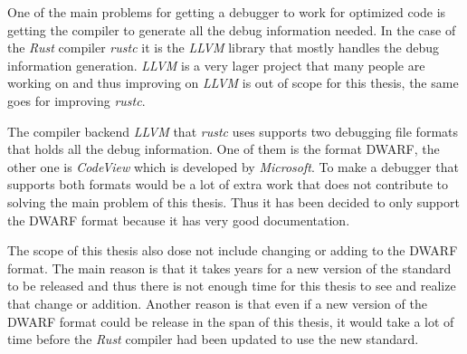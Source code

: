 




One of the main problems for getting a debugger to work for optimized code is getting the compiler to generate all the debug information needed.
In the case of the \emph{Rust} compiler \emph{rustc} it is the \emph{LLVM} library that mostly handles the debug information generation.
\emph{LLVM} is a very lager project that many people are working on and thus improving on \emph{LLVM} is out of scope for this thesis, the same goes for improving \emph{rustc}.


The compiler backend \emph{LLVM} that \emph{rustc} uses supports two debugging file formats that holds all the debug information.
One of them is the format \gls{DWARF}, the other one is \emph{CodeView} which is developed by \emph{Microsoft}.
To make a debugger that supports both formats would be a lot of extra work that does not contribute to solving the main problem of this thesis.
Thus it has been decided to only support the \gls{DWARF} format because it has very good documentation.


The scope of this thesis also dose not include changing or adding to the \gls{DWARF} format.
The main reason is that it takes years for a new version of the standard to be released and thus there is not enough time for this thesis to see and realize that change or addition.
Another reason is that even if a new version of the \gls{DWARF} format could be release in the span of this thesis, it would take a lot of time before the \emph{Rust} compiler had been updated to use the new standard.


